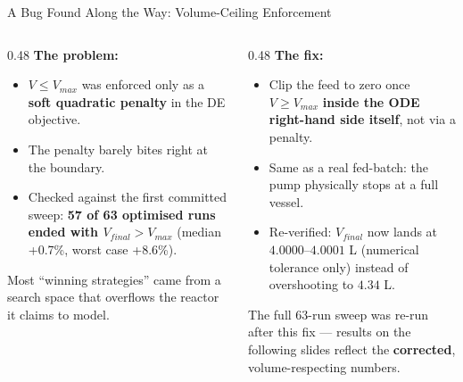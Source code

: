 \documentclass[aspectratio=169, 11pt]{beamer}
\begin{document}
\begin{frame}{A Bug Found Along the Way: Volume-Ceiling Enforcement}
  \begin{columns}[T]
    \begin{column}{0.48\textwidth}
      \textbf{The problem:}
      \begin{itemize}
        \item $V \leq V_{max}$ was enforced only as a \textbf{soft quadratic penalty}
              in the DE objective.
        \item The penalty barely bites right at the boundary.
        \item Checked against the first committed sweep: \textbf{57 of 63 optimised
              runs ended with $V_{final} > V_{max}$} (median +0.7\%, worst case +8.6\%).
      \end{itemize}
      Most ``winning strategies'' came from a search space that overflows the
      reactor it claims to model.
    \end{column}
    \begin{column}{0.48\textwidth}
      \textbf{The fix:}
      \begin{itemize}
        \item Clip the feed to zero once $V \geq V_{max}$ \textbf{inside the ODE
              right-hand side itself}, not via a penalty.
        \item Same as a real fed-batch: the pump physically stops at a full vessel.
        \item Re-verified: $V_{final}$ now lands at $4.0000$--$4.0001$ L (numerical
              tolerance only) instead of overshooting to $4.34$ L.
      \end{itemize}
      \vspace{0.2cm}
      \begin{block}{}
        \small The full 63-run sweep was re-run after this fix --- results on the
        following slides reflect the \textbf{corrected}, volume-respecting numbers.
      \end{block}
    \end{column}
  \end{columns}
\end{frame}
\end{document}
